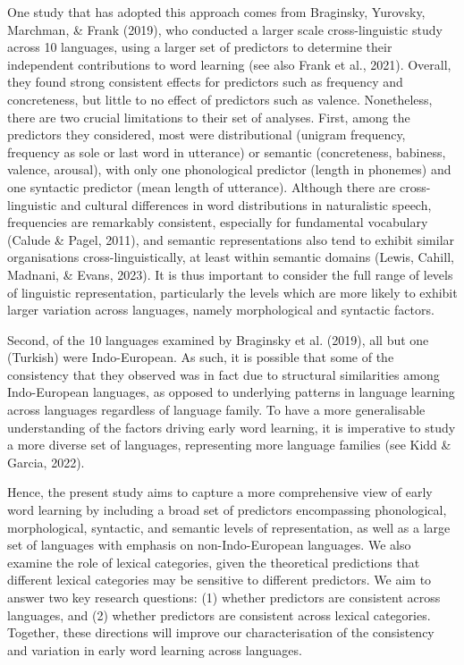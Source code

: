 \documentclass[10pt, letterpaper]{article}
\begin{document}
One study that has adopted this approach comes from Braginsky, Yurovsky,
Marchman, \& Frank (2019), who conducted a larger scale cross-linguistic
study across 10 languages, using a larger set of predictors to determine
their independent contributions to word learning (see also Frank et al.,
2021). Overall, they found strong consistent effects for predictors such
as frequency and concreteness, but little to no effect of predictors
such as valence. Nonetheless, there are two crucial limitations to their
set of analyses. First, among the predictors they considered, most were
distributional (unigram frequency, frequency as sole or last word in
utterance) or semantic (concreteness, babiness, valence, arousal), with
only one phonological predictor (length in phonemes) and one syntactic
predictor (mean length of utterance). Although there are
cross-linguistic and cultural differences in word distributions in
naturalistic speech, frequencies are remarkably consistent, especially
for fundamental vocabulary (Calude \& Pagel, 2011), and semantic
representations also tend to exhibit similar organisations
cross-linguistically, at least within semantic domains (Lewis, Cahill,
Madnani, \& Evans, 2023). It is thus important to consider the full
range of levels of linguistic representation, particularly the levels
which are more likely to exhibit larger variation across languages,
namely morphological and syntactic factors.

Second, of the 10 languages examined by Braginsky et al. (2019), all but
one (Turkish) were Indo-European. As such, it is possible that some of
the consistency that they observed was in fact due to structural
similarities among Indo-European languages, as opposed to underlying
patterns in language learning across languages regardless of language
family. To have a more generalisable understanding of the factors
driving early word learning, it is imperative to study a more diverse
set of languages, representing more language families (see Kidd \&
Garcia, 2022).

Hence, the present study aims to capture a more comprehensive view of
early word learning by including a broad set of predictors encompassing
phonological, morphological, syntactic, and semantic levels of
representation, as well as a large set of languages with emphasis on
non-Indo-European languages. We also examine the role of lexical
categories, given the theoretical predictions that different lexical
categories may be sensitive to different predictors. We aim to answer
two key research questions: (1) whether predictors are consistent across
languages, and (2) whether predictors are consistent across lexical
categories. Together, these directions will improve our characterisation
of the consistency and variation in early word learning across
languages.
\end{document}
